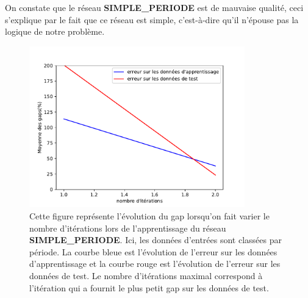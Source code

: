  On constate que le réseau \textbf{SIMPLE\_PERIODE} est de mauvaise qualité, ceci s'explique par le fait que ce réseau est \og simple\fg{}, c'est-à-dire qu'il n'épouse pas la logique de notre problème.
  
  
  
  \begin{figure}[H]
  	\centerline{
  		\includegraphics[height=7cm]{images_these/Gap_PROD_prediction_sequentialModel_test_valid_data__by_period.pdf}}
  	\caption[Le gap du réseau SIMPLE\_PERIODE]{Cette figure représente l'évolution du gap lorsqu'on fait varier le nombre d'itérations lors de l'apprentissage du réseau \textbf{SIMPLE\_PERIODE}. Ici, les données d'entrées sont classées par période. La courbe bleue est l'évolution de l'erreur sur les données d'apprentissage et la courbe rouge est l'évolution de l'erreur sur les données de test. Le nombre d'itérations maximal correspond à l'itération qui a fournit le plus petit gap sur les données de test.}
  	\label{6000_loss_sequentialModel_by_period_1}
  \end{figure}
  

